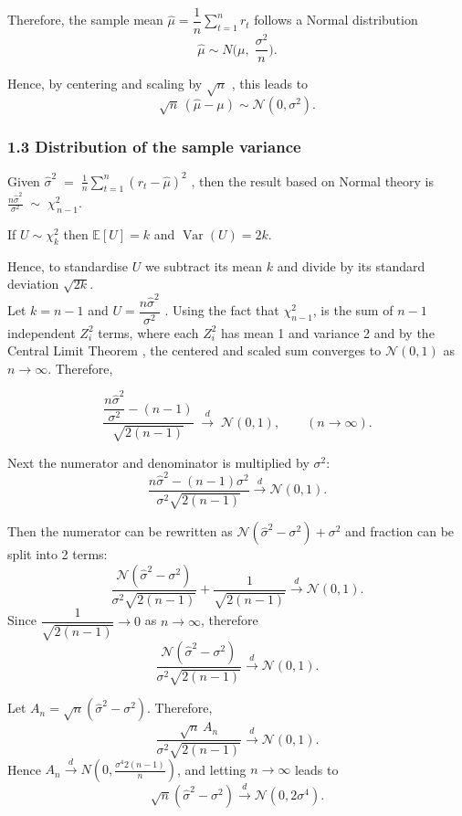 \documentclass[
  12pt,
]{article}
\begin{document}
Therefore, the sample mean \(\widehat\mu=\dfrac{1}{n}\sum_{t=1}^n r_t\)
follows a Normal distribution \[
\widehat\mu \sim N\!\Big(\mu,\; \frac{\sigma^2}{n}\Big). \tag{2}
\]

Hence, by centering and scaling by \(\sqrt{n}\) , this leads to \[
\sqrt{n}\,(\widehat\mu-\mu) \sim \mathcal{N}(0,\sigma^2). \tag{3}
\]

\subsubsection{1.3 Distribution of the sample
variance}\label{distribution-of-the-sample-variance}

Given
\(\widehat\sigma^2 \;=\; \frac{1}{n}\sum_{t=1}^n (r_t - \widehat\mu)^2\)
, then the result based on Normal theory is
\(\frac{n\widehat\sigma^2}{\sigma^2} \;\sim\; \chi^2_{\,n-1}.\)

If \(U \sim \chi^2_k\) then \(\mathbb{E}[U]=k\) and
\(\operatorname{Var}(U)=2k.\)

Hence, to standardise \(U\) we subtract its mean \(k\) and divide by its
standard deviation \(\sqrt{2k}\).\\
Let \(k=n-1\) and \(U = \dfrac{n\widehat\sigma^2}{\sigma^2}\) . Using
the fact that \(\chi_{n-1}^2\), is the sum of \(n-1\) independent
\(Z_i^2\) terms, where each \(Z_i^2\) has mean 1 and variance 2 and by
the Central Limit Theorem , the centered and scaled sum converges to
\(\mathcal{N}(0,1)\) as \(n \to \infty\). Therefore,

\[
\frac{\dfrac{n\widehat\sigma^2}{\sigma^2}-(n-1)}{\sqrt{2(n-1)}} \;\xrightarrow{d}\; \mathcal{N}(0,1), \qquad (n\to\infty)   \tag{4}.
\]

Next the numerator and denominator is multiplied by \(\sigma^2\): \[
\frac{n\widehat\sigma^2-(n-1)\sigma^2}{\sigma^2\sqrt{2(n-1)}} \xrightarrow{d} \mathcal{N}(0,1) \tag{5}.
\]

Then the numerator can be rewritten as
\(\mathcal{N}(\widehat\sigma^2-\sigma^2)+\sigma^2\) and fraction can be
split into 2 terms: \[
\frac{\mathcal{N}(\widehat\sigma^2-\sigma^2)}{\sigma^2\sqrt{2(n-1)}} + \frac{1}{\sqrt{2(n-1)}} \xrightarrow{d} \mathcal{N}(0,1) \tag{6}.
\] Since \(\dfrac{1}{\sqrt{2(n-1)}}\to 0\) as \(n\to\infty\), therefore
\[
\frac{\mathcal{N}(\widehat\sigma^2-\sigma^2)}{\sigma^2\sqrt{2(n-1)}} \xrightarrow{d} \mathcal{N}(0,1) \tag{7}.
\]

Let \(A_n=\sqrt{n}(\widehat\sigma^2-\sigma^2)\). Therefore, \[
\frac{\sqrt{n}\,A_n}{\sigma^2\sqrt{2(n-1)}} \xrightarrow{d} \mathcal{N}(0,1) \tag{8}.
\] Hence
\(A_n \xrightarrow{d} N\!\left(0,\frac{\sigma^4 2(n-1)}{n}\right)\), and
letting \(n\to\infty\) leads to \[
\sqrt{n}(\widehat\sigma^2-\sigma^2)\xrightarrow{d} \mathcal{N}(0,2\sigma^4) \tag{9}.
\]
\end{document}
